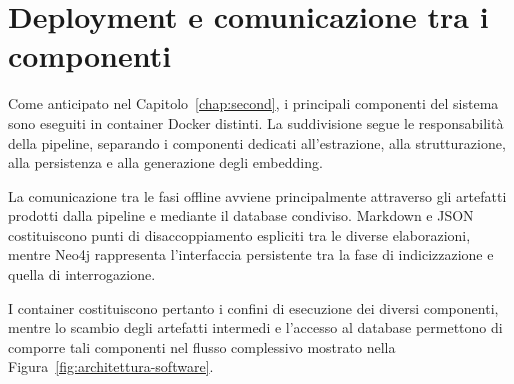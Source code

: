 \section{Deployment e comunicazione tra i componenti}

Come anticipato nel Capitolo~\ref{chap:second}, i principali componenti del sistema sono eseguiti in container Docker distinti. La suddivisione segue le responsabilità della pipeline, separando i componenti dedicati all'estrazione, alla strutturazione, alla persistenza e alla generazione degli embedding.

La comunicazione tra le fasi offline avviene principalmente attraverso gli artefatti prodotti dalla pipeline e mediante il database condiviso. Markdown e JSON costituiscono punti di disaccoppiamento espliciti tra le diverse elaborazioni, mentre Neo4j rappresenta l'interfaccia persistente tra la fase di indicizzazione e quella di interrogazione.

I container costituiscono pertanto i confini di esecuzione dei diversi componenti, mentre lo scambio degli artefatti intermedi e l'accesso al database permettono di comporre tali componenti nel flusso complessivo mostrato nella Figura~\ref{fig:architettura-software}.
